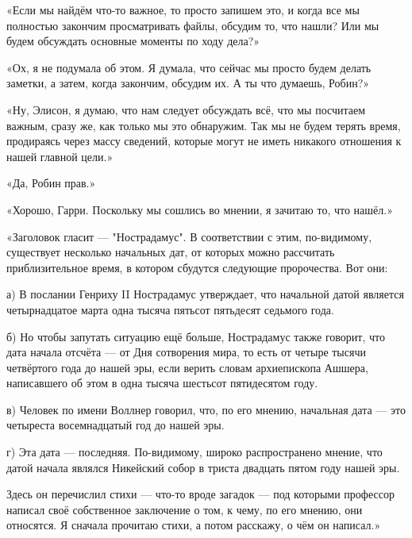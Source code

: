 \documentclass[a5paper, 9pt,
final, openany, twoside=true]{memoir}
\begin{document}
«Если мы найдём что-то важное, то просто запишем это, и когда все мы полностью закончим просматривать файлы, обсудим то, что нашли? Или мы будем обсуждать основные моменты по ходу дела?»

«Ох, я не подумала об этом. Я думала, что сейчас мы просто будем делать заметки, а затем, когда закончим, обсудим их. А ты что думаешь, Робин?»

«Ну, Элисон, я думаю, что нам следует обсуждать всё, что мы посчитаем важным, сразу же, как только мы это обнаружим. Так мы не будем терять время, продираясь через массу сведений, которые могут не иметь никакого отношения к нашей главной цели.»

«Да, Робин прав.»

«Хорошо, Гарри. Поскольку мы сошлись во мнении, я зачитаю то, что нашёл.»

«Заголовок гласит — "Нострадамус". В соответствии с этим, по-видимому, существует несколько начальных дат, от которых можно рассчитать приблизительное время, в котором сбудутся следующие пророчества. Вот они:\bigskip

а) В послании Генриху II Нострадамус утверждает, что начальной датой является четырнадцатое марта одна тысяча пятьсот пятьдесят седьмого года.

б) Но чтобы запутать ситуацию ещё больше, Нострадамус также говорит, что дата начала отсчёта — от Дня сотворения мира, то есть от четыре тысячи четвёртого года до нашей эры, если верить словам архиепископа Ашшера, написавшего об этом в одна тысяча шестьсот пятидесятом году.

в)  Человек по имени Воллнер говорил, что, по его мнению, начальная дата — это четыреста восемнадцатый год до нашей эры.

г) Эта дата — последняя. По-видимому, широко распространено мнение, что датой начала являлся Никейский собор в триста двадцать пятом году нашей эры.

Здесь он перечислил стихи — что-то вроде загадок — под которыми профессор написал своё собственное заключение о том, к чему, по его мнению, они относятся. Я сначала прочитаю стихи, а потом расскажу, о чём он написал.»
\end{document}

